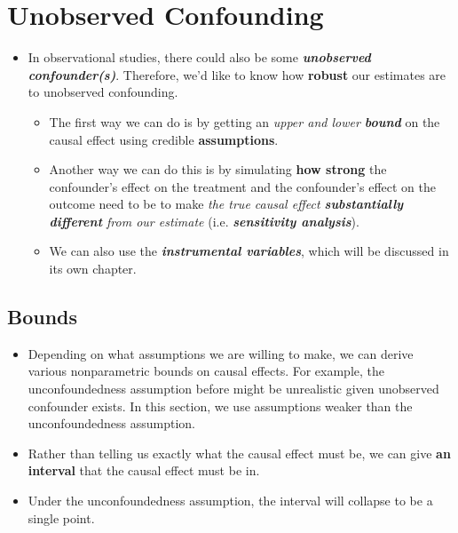 \documentclass[11pt]{article}
\begin{document}
\section{Unobserved Confounding}
\begin{itemize}
\item In observational studies, there could also be some \emph{\textbf{unobserved confounder(s)}}. Therefore, we’d like to know how \textbf{robust} our estimates are to unobserved confounding.
\begin{itemize}
\item The first way we can do is by getting an \emph{upper and lower \textbf{bound}} on the causal effect using credible \textbf{assumptions}.

\item Another way we can do this is by simulating \textbf{how strong} the confounder’s effect on the treatment and the confounder’s effect on the
outcome need to be to make \emph{the true causal effect \textbf{substantially different} from our estimate} (i.e. \emph{\textbf{sensitivity analysis}}).

\item We can also use the \textbf{\emph{instrumental variables}}, which will be discussed in its own chapter.
\end{itemize}
\end{itemize}
\subsection{Bounds}
\begin{itemize}
\item Depending on what assumptions we are willing to make, we can derive various nonparametric bounds on causal effects. For example, the unconfoundedness assumption before might be unrealistic given unobserved confounder exists. In this section, we use assumptions weaker than the unconfoundedness assumption.

\item Rather than telling us exactly what the causal effect must be, we can give \textbf{an interval} that the causal effect must be in. 

\item Under the unconfoundedness assumption, the interval will collapse to be a single point.  
\end{itemize}
\end{document}
